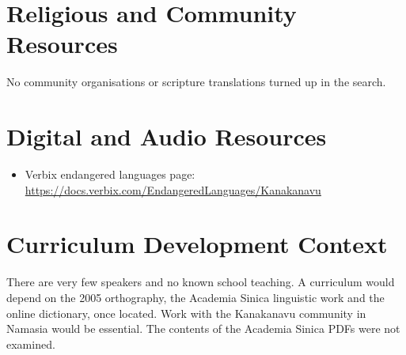 \documentclass[12pt]{article}
\begin{document}
\section{Religious and Community Resources}
No community organisations or scripture translations turned up in the search.

\section{Digital and Audio Resources}
\begin{itemize}
\item Verbix endangered languages page: \url{https://docs.verbix.com/EndangeredLanguages/Kanakanavu}
\end{itemize}

\section{Curriculum Development Context}
There are very few speakers and no known school teaching. A curriculum would depend on the 2005 orthography, the Academia Sinica linguistic work and the online dictionary, once located. Work with the Kanakanavu community in Namasia would be essential. The contents of the Academia Sinica PDFs were not examined.
\end{document}
